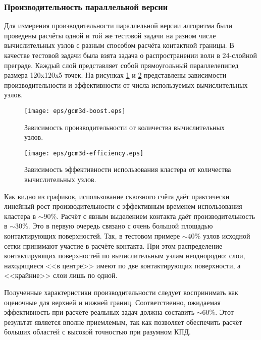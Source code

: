\subsubsection{Производительность параллельной версии}
Для измерения производительности параллельной версии алгоритма были проведены
расчёты одной и той же тестовой задачи на разном числе вычислительных узлов с
разным способом расчёта контактной границы. В
качестве тестовой задачи была взята задача о распространении волн в 24-слойной
преграде. Каждый слой представляет собой прямоугольный параллелепипед размера
120x120x5 точек. На рисунках \ref{pic:gcm_boost} и
\ref{pic:gcm_efficiency} представлены зависимости производительности и
эффективности от числа используемых вычислительных узлов.
\begin{figure}[htp]
\centering
\texttt{[image: eps/gcm3d-boost.eps]}
\caption{Зависимость производительности от количества вычислительных узлов.}
\label{pic:gcm_boost}
\end{figure}
\begin{figure}[htp]
\centering
\texttt{[image: eps/gcm3d-efficiency.eps]}
\caption{Зависимость эффективности использования кластера от количества
вычислительных узлов.}
\label{pic:gcm_efficiency}
\end{figure}

Как видно из графиков, использование сквозного счёта даёт практически линейный
рост производительности с эффективным временем использования кластера в $\sim
90\%$.
Расчёт с явным выделением контакта даёт производительность в $\sim30\%$. Это  в
первую очередь связано с очень большой площадью контактирующих поверхностей. Так, в тестовом
примере $\sim 40\%$ узлов исходной сетки принимают участие в расчёте контакта.
При этом распределение контактирующих поверхностей по вычислительным узлам
неоднородно: слои, находящиеся <<в центре>> имеют по две контактирующих
поверхности, а <<крайние>> слои лишь по одной.

Полученные характеристики производительности следует воспринимать как оценочные
для верхней и нижней границ. Соответственно, ожидаемая эффективность при расчёте
реальных задач должна составить $\sim 60\%$. Этот результат является вполне
приемлемым, так как позволяет обеспечить расчёт больших областей с высокой
точностью при разумном КПД.

